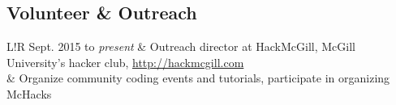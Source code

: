 \documentclass{article}
\newcommand\VRule{\color{lightgray}\vrule width 0.5pt}
\begin{document}
\subsection*{Volunteer \& Outreach}

\begin{tabular}[h]{L!{\VRule}R}
    Sept. 2015 to \emph{present}
        & Outreach director at HackMcGill, McGill University's hacker club, \url{http://hackmcgill.com} \\
        & Organize community coding events and tutorials, participate in organizing McHacks
\end{tabular}
\end{document}
